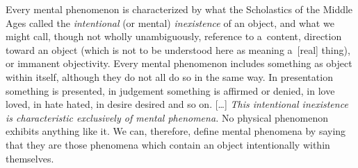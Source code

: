 Every mental phenomenon is characterized by what the Scholastics of the Middle Ages called the \textit{intentional} (or mental) \textit{inexistence} of an object, and what we might call, though not wholly unambiguously, reference to a~content, direction toward an object (which is not to be understood here as meaning a~[real] thing), or immanent objectivity. Every mental phenomenon includes something as object within itself, although they do not all do so in the same way. In presentation something is presented, in judgement something is affirmed or denied, in love loved, in hate hated, in desire desired and so on. […] \textit{This intentional inexistence is characteristic exclusively of mental phenomena.} No physical phenomenon exhibits anything like it. We can, therefore, define mental phenomena by saying that they are those phenomena which contain an object intentionally within themselves. 
\parencites[][p.68]{brentano_psychology_2009}[orig. 1874,][]{}[emphasis added,][]{}%




